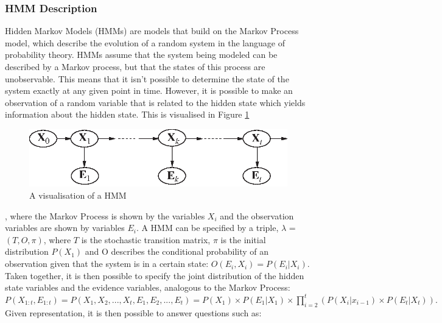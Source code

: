 \subsubsection{HMM Description}
Hidden Markov Models (HMMs) are models that build on the Markov Process model, which describe the evolution of a random system in the language of probability theory. HMMs assume that the system being modeled can be described by a Markov process, but that the states of this process are unobservable. This means that it isn't possible to determine the state of the system exactly at any given point in time. However, it is possible to make an observation of a random variable that is related to the hidden state which yields information about the hidden state. This is visualised in Figure \ref{fig:hmm}
\begin{figure}[]
    \centering
    \includegraphics{Chapters/MultiAgentProbabilisticSearch/BayesianFiltering/Figs/smoothing-dbn.eps}
    \caption{A visualisation of a HMM \cite{AIAMA}}
    \label{fig:hmm}
\end{figure}
, where the Markov Process is shown by the variables $X_i$ and the observation variables are shown by variables $E_i$. A HMM can be specified by a triple, $\lambda$ = $(T, O, \pi)$, where $T$ is the stochastic transition matrix, $\pi$ is the initial distribution $P(X_1)$ and O describes the conditional probability of an observation given that the system is in a certain state: $O(E_i, X_i) = P(E_{i} | X_{i})$. Taken together, it is then possible to specify the joint distribution of the hidden state variables and the evidence variables, analogous to the Markov Process: 
$
P(X_{1:t}, E_{1:t}) = P(X_1, X_2, ..., X_t, E_1, E_2, ..., E_t) = P(X_1) \times P(E_1 | X_1) \times
\prod_{i=2}^{t}{(P(X_i | x_{i-1}) \times P(E_t | X_t))}.
$Given representation, it is then possible to answer questions such as:
